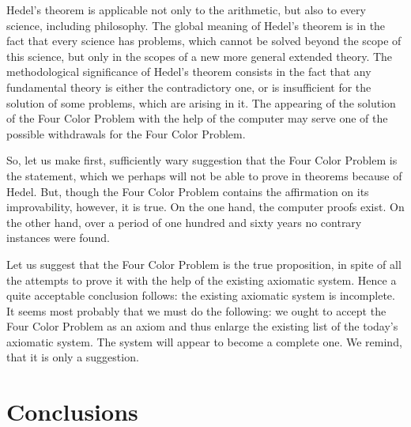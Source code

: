 \documentclass{amsart}
\theoremstyle{plain}
\numberwithin{equation}{section}
\begin{document}
Hedel's theorem is applicable not only to the arithmetic, but also to every science, including philosophy. The global meaning of Hedel's theorem is in the fact that every science has problems, which cannot be solved beyond the scope of this science, but only in the scopes of a new more general extended theory. The methodological significance of Hedel's theorem consists in the fact that any fundamental theory is either the contradictory one, or is insufficient for the solution of some problems, which are arising in it. The appearing of the solution of the Four Color Problem with the help of the computer may serve one of the possible withdrawals for the Four Color Problem.

So, let us make first, sufficiently wary suggestion that the Four Color Problem is the statement, which we perhaps will not be able to prove in theorems because of Hedel. But, though the Four Color Problem contains the affirmation on its improvability, however, it is true. On the one hand, the computer proofs exist. On the other hand, over a period of one hundred and sixty years no contrary instances were found.

Let us suggest that the Four Color Problem is the true proposition, in spite of all the attempts to prove it with the help of the existing axiomatic system. Hence a quite acceptable conclusion follows: the existing axiomatic system is incomplete. It seems most probably that we must do the following: we ought to accept the Four Color Problem as an axiom and thus enlarge the existing list of the today's axiomatic system. The system will appear to become a complete one. We remind, that it is only a suggestion.

\section {Conclusions}
\end{document}
